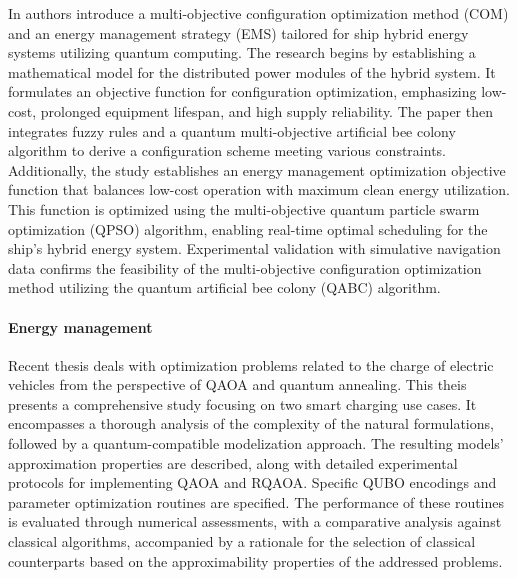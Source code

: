 \documentclass[a4paper,11pt]{article}
\begin{document}
In \cite{si2022configuration} authors introduce a multi-objective configuration optimization method (COM) and an energy management strategy (EMS) tailored for ship hybrid energy systems utilizing quantum computing. The research begins by establishing a mathematical model for the distributed power modules of the hybrid system. It formulates an objective function for configuration optimization, emphasizing low-cost, prolonged equipment lifespan, and high supply reliability. The paper then integrates fuzzy rules and a quantum multi-objective artificial bee colony algorithm to derive a configuration scheme meeting various constraints. Additionally, the study establishes an energy management optimization objective function that balances low-cost operation with maximum clean energy utilization. This function is optimized using the multi-objective quantum particle swarm optimization (QPSO) algorithm, enabling real-time optimal scheduling for the ship's hybrid energy system. Experimental validation with simulative navigation data confirms the feasibility of the multi-objective configuration optimization method utilizing the quantum artificial bee colony (QABC) algorithm.






\paragraph{Energy management}

Recent thesis \cite{veshchezerova2022quantum} deals with optimization problems related to the charge of electric vehicles from the perspective of QAOA and quantum annealing. This theis presents a comprehensive study focusing on two smart charging use cases. It encompasses a thorough analysis of the complexity of the natural formulations, followed by a quantum-compatible modelization approach. The resulting models' approximation properties are described, along with detailed experimental protocols for implementing QAOA and RQAOA. Specific QUBO encodings and parameter optimization routines are specified. The performance of these routines is evaluated through numerical assessments, with a comparative analysis against classical algorithms, accompanied by a rationale for the selection of classical counterparts based on the approximability properties of the addressed problems.
\end{document}
